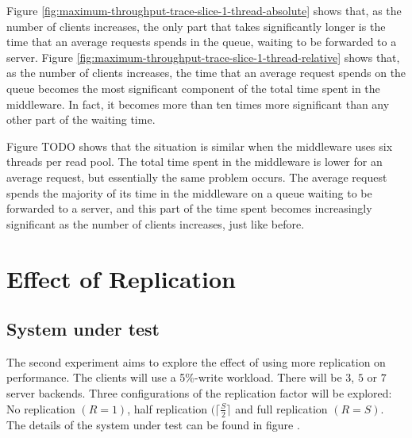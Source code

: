 \documentclass[11pt]{article}
\begin{document}
Figure \ref{fig:maximum-throughput-trace-slice-1-thread-absolute} shows that, as the number of clients increases, the only part that takes significantly longer is the time that an average requests spends in the queue, waiting to be forwarded to a server.
Figure \ref{fig:maximum-throughput-trace-slice-1-thread-relative} shows that, as the number of clients increases, the time that an average request spends on the queue becomes the most significant component of the total time spent in the middleware.
In fact, it becomes more than ten \FIWRD times more significant than any other part of the waiting time.

Figure TODO shows that the situation is similar when the middleware uses six \FIWRD threads per read pool.
The total time spent in the middleware is lower for an average request, but essentially the same problem occurs.
The average request spends the majority of its time in the middleware on a queue waiting to be forwarded to a server, and this part of the time spent becomes increasingly significant as the number of clients increases, just like before.


\section{Effect of Replication}

% 

\subsection{System under test}

The second experiment aims to explore the effect of using more replication on performance.
The clients will use a 5\%-write workload.
There will be $3$, $5$ or $7$ server backends.
Three configurations of the replication factor will be explored: No replication $(R=1)$, half replication $(\lceil \frac{S}{2} \rceil$ and full replication $(R=S)$.
The details of the system under test can be found in figure .
\end{document}
